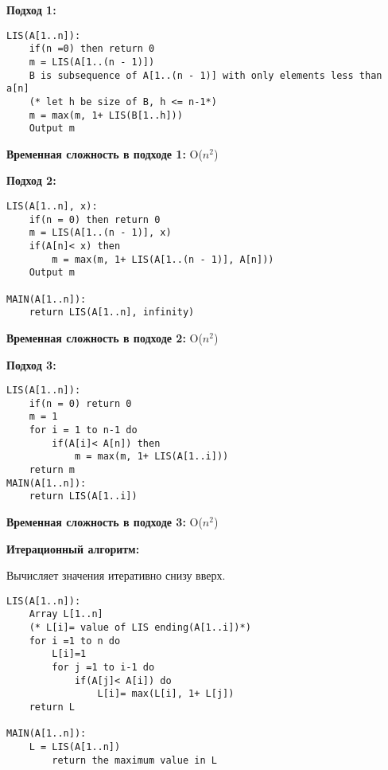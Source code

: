 \textbf{Подход 1:}
\vspace{\baselineskip}
\begin{tcolorbox}
\begin{verbatim}
LIS(A[1..n]):
	if(n =0) then return 0
	m = LIS(A[1..(n - 1)])
	B is subsequence of A[1..(n - 1)] with only elements less than a[n]
	(* let h be size of B, h <= n-1*)
	m = max(m, 1+ LIS(B[1..h]))
	Output m
\end{verbatim}
\end{tcolorbox}
\vspace{\baselineskip}
\textbf{Временная сложность в подходе 1:} O($n^2$)
\vspace{\baselineskip}

\textbf{Подход 2:}
\vspace{\baselineskip}
\begin{tcolorbox}
\begin{verbatim}
LIS(A[1..n], x):
	if(n = 0) then return 0
	m = LIS(A[1..(n - 1)], x)
	if(A[n]< x) then
		m = max(m, 1+ LIS(A[1..(n - 1)], A[n]))
	Output m
	
MAIN(A[1..n]):
	return LIS(A[1..n], infinity)
\end{verbatim}
\end{tcolorbox}
\vspace{\baselineskip}

\textbf{Временная сложность в подходе 2:} O($n^2$)
\vspace{\baselineskip}

\textbf{Подход 3:}
\vspace{\baselineskip}
\begin{verbatim}
LIS(A[1..n]):
	if(n = 0) return 0
	m = 1 
	for i = 1 to n-1 do
		if(A[i]< A[n]) then
			m = max(m, 1+ LIS(A[1..i]))
	return m
MAIN(A[1..n]):
	return LIS(A[1..i])
\end{verbatim}
\vspace{\baselineskip}

\textbf{Временная сложность в подходе 3:} O($n^2$)
\vspace{\baselineskip}

\textbf{Итерационный алгоритм:}
\vspace{\baselineskip}

Вычисляет значения итеративно снизу вверх.
\vspace{\baselineskip}
\begin{tcolorbox}
\begin{verbatim}
LIS(A[1..n]):
	Array L[1..n]
	(* L[i]= value of LIS ending(A[1..i])*)
	for i =1 to n do
		L[i]=1
		for j =1 to i-1 do
			if(A[j]< A[i]) do
				L[i]= max(L[i], 1+ L[j])
	return L
	
MAIN(A[1..n]):
	L = LIS(A[1..n])
		return the maximum value in L
\end{verbatim}
\end{tcolorbox}
\vspace{\baselineskip}

